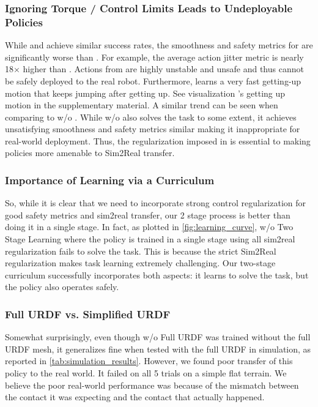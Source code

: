 

\subsubsection{Ignoring Torque / Control Limits Leads to Undeployable Policies}
While \cite{Learning2GetUp22} and \ours achieve similar success rates, the smoothness and safety metrics for \cite{Learning2GetUp22} are significantly worse than \ours.
For example, the average action jitter metric is nearly 18$\times$ higher than \ours. Actions from \cite{Learning2GetUp22} are highly unstable and unsafe and thus cannot be safely deployed to the real robot. Furthermore, \cite{Learning2GetUp22} learns a very fast getting-up motion that keeps jumping after getting up. See visualization \cite{Learning2GetUp22}'s getting up motion in the supplementary material. A similar trend can be seen when comparing \ours to \ours w/o \stwo. While \ours w/o \stwo also solves the task to some extent, it achieves unsatisfying smoothness and safety metrics similar making it inappropriate for real-world deployment. Thus, the regularization imposed in \stwo is essential to making policies more amenable to Sim2Real transfer.

\subsubsection{Importance of Learning via a Curriculum}
So, while it is clear that we need to incorporate strong control regularization for good safety metrics and sim2real transfer, our 2 stage process is better than doing it in a single stage. In fact, as plotted in \cref{fig:learning_curve}, \ours w/o Two Stage Learning where the policy is trained in a single stage using all sim2real regularization fails to solve the task. This is because the strict Sim2Real regularization makes task learning extremely challenging. Our two-stage curriculum successfully incorporates both aspects: it learns to solve the task, but the policy also operates safely.

\subsubsection{Full URDF vs. Simplified URDF}
Somewhat surprisingly, even though \ours w/o Full URDF was trained without the full URDF mesh, it generalizes fine when tested with the full URDF in simulation, as reported in \cref{tab:simulation_results}. However, we found poor transfer of this policy to the real world. 
It failed on all 5 trials on a simple flat terrain. We believe the poor real-world performance was because of the mismatch between the contact it was expecting and the contact that actually happened.
 

